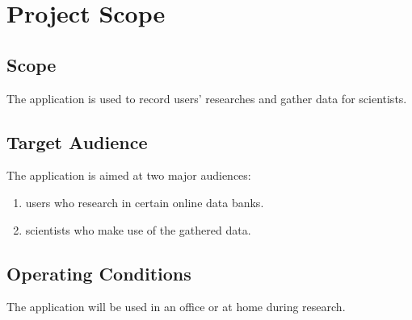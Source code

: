 \chapter{Project Scope}
\label{ch:scope}

\section{Scope}
The application is used to record \glspl{user}' researches and gather data for \glspl{scientist}.
\section{Target Audience}
The application is aimed at two major audiences:
\begin{enumerate}
    \item \Glspl{user} who research in certain online data banks.
    \item \Glspl{scientist} who make use of the gathered data.
\end{enumerate}
\section{Operating Conditions}
The application will be used in an office or at home during research.